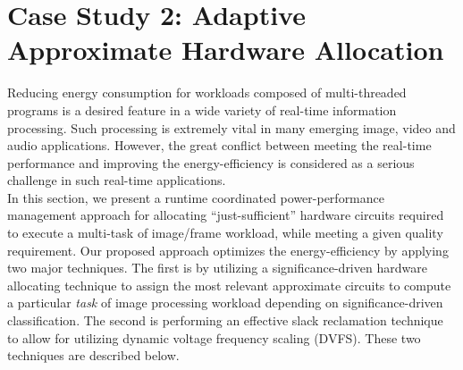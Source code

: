 \documentclass[journal]{IEEEtran}
\begin{document}
\section{Case Study 2: Adaptive Approximate Hardware Allocation}
Reducing energy consumption for workloads composed of multi-threaded programs is a desired feature in a wide variety of real-time information processing. Such processing is extremely vital in many emerging image, video and audio applications. However, the great conflict between meeting the real-time performance and improving the energy-efficiency is considered as a serious challenge in such real-time applications.\\
In this section, we present a runtime coordinated power-performance management approach for allocating ``just-sufficient'' hardware circuits required to execute a multi-task of image/frame workload, while meeting a given quality requirement. Our proposed approach optimizes the energy-efficiency by applying two major techniques. The first is by utilizing a significance-driven hardware allocating technique to assign the most relevant approximate circuits to compute a particular \emph{task} of image processing workload depending on significance-driven classification. The second is performing an effective slack reclamation technique to allow for utilizing dynamic voltage frequency scaling (DVFS). These two techniques are described below. \\ 
\end{document}
